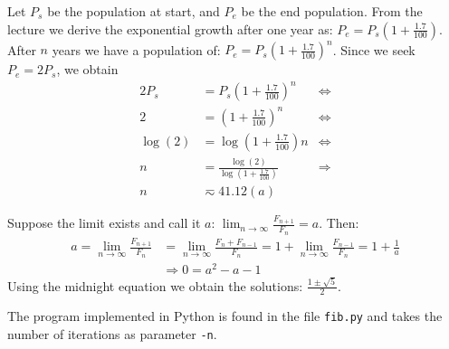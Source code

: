 \documentclass[10pt,a4paper,boxed]{hmcpset}
\begin{document}
\begin{problem}[Assignment 31]
\end{problem}
\begin{solution}
Let $P_s$ be the population at start, and $P_e$ be the end population.
From the lecture we derive the exponential growth after one year as: $P_e = P_s \left( 1 + \frac{1.7}{100} \right)$.
After $n$ years we have a population of: $P_e = P_s \left( 1 + \frac{1.7}{100} \right)^n$. Since we seek $P_e = 2 P_s$, we obtain
\begin{align*}
	2 P_s & = P_s \left( 1 + \frac{1.7}{100} \right)^n & \Leftrightarrow \\
	2 & = \left( 1 + \frac{1.7}{100} \right)^n & \Leftrightarrow \\
	\log(2) & = \log \left( 1 + \frac{1.7}{100} \right) n & \Leftrightarrow \\
	n & = \frac{\log(2)}{\log \left( 1 + \frac{1.7}{100} \right)} & \Rightarrow \\
	n & \eqsim 41.12 (a)
\end{align*}
\end{solution}

\begin{problem}[Assignment 32]
\end{problem}
\begin{solution}
\end{solution}

\begin{problem}[Assignment 33]
\end{problem}
\begin{solution}
\end{solution}

\begin{problem}[Assignment 34]
\end{problem}
\begin{solution}
\end{solution}

\begin{problem}[Assignment 35]
\end{problem}
\begin{solution}
Suppose the limit exists and call it $a$: $\lim_{n \rightarrow \infty} \frac{F_{n+1}}{F_n} = a$. Then:
\begin{align*}
	a = \lim_{n \rightarrow \infty} \frac{F_{n+1}}{F_n} & = \lim_{n \rightarrow \infty} \frac{F_{n}+F_{n-1}}{F_n} = 1 + \lim_{n \rightarrow \infty} \frac{F_{n-1}}{F_n} = 1 + \frac{1}{a} \\
	& \Rightarrow 0 = a^2 - a - 1 
\end{align*}
Using the midnight equation we obtain the solutions: $\frac{1 \pm \sqrt{5}}{2}$.

The program implemented in Python is found in the file \verb|fib.py| and takes the number of iterations as parameter \verb|-n|.
\end{solution}

\begin{problem}[Assignment 36]
\end{problem}
\begin{solution}
\end{solution}
\end{document}
